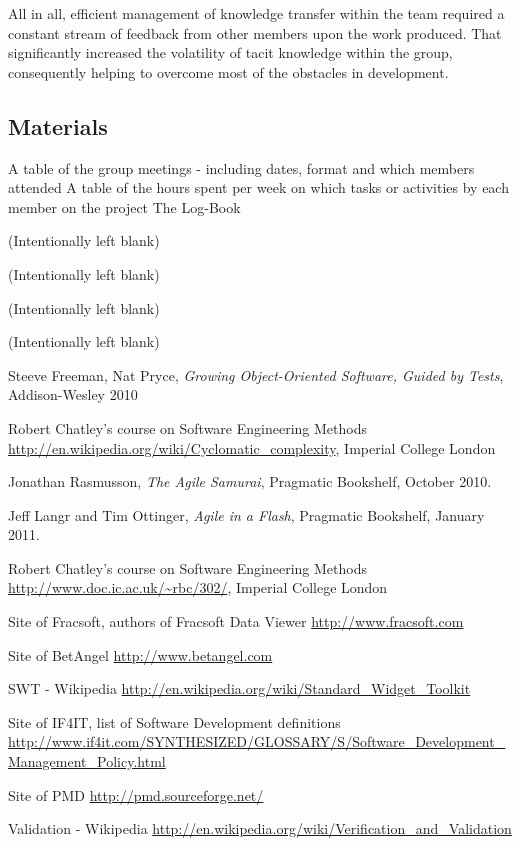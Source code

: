 \documentclass[10pt]{article}
\begin{document}
All in all, efficient management of knowledge transfer within the team required a constant stream of feedback from other members upon the work produced. That significantly increased the volatility of tacit knowledge within the group, consequently helping to overcome most of the obstacles in development.

\subsection{Materials}

A table of the group meetings - including dates, format and which members attended
A table of the hours spent per week on which tasks or activities by each member on the project
The Log-Book

\clearpage
(Intentionally left blank)

\clearpage
(Intentionally left blank)

\clearpage
(Intentionally left blank)

\clearpage
(Intentionally left blank)

\clearpage

\begin{thebibliography}{9}
  Steeve Freeman, Nat Pryce,
  \emph{Growing Object-Oriented Software, Guided by Tests}, Addison-Wesley 2010

  Robert Chatley's course on Software Engineering Methods
  \url{http://en.wikipedia.org/wiki/Cyclomatic_complexity},
  Imperial College London

  Jonathan Rasmusson,
  \emph{The Agile Samurai},
  Pragmatic Bookshelf,
  October 2010.

  Jeff Langr and Tim Ottinger,
  \emph{Agile in a Flash},
  Pragmatic Bookshelf, 
  January 2011.

  Robert Chatley's course on Software Engineering Methods
  \url{http://www.doc.ic.ac.uk/~rbc/302/},
  Imperial College London

  Site of Fracsoft, authors of Fracsoft Data Viewer
  \url{http://www.fracsoft.com}

  Site of BetAngel
  \url{http://www.betangel.com}
  
  SWT - Wikipedia
  \url{http://en.wikipedia.org/wiki/Standard_Widget_Toolkit}

  Site of IF4IT, list of Software Development definitions
  \url{http://www.if4it.com/SYNTHESIZED/GLOSSARY/S/Software_Development_Management_Policy.html}

  Site of PMD
  \url{http://pmd.sourceforge.net/}

  Validation - Wikipedia
  \url{http://en.wikipedia.org/wiki/Verification_and_Validation}

\end{thebibliography}
\end{document}
